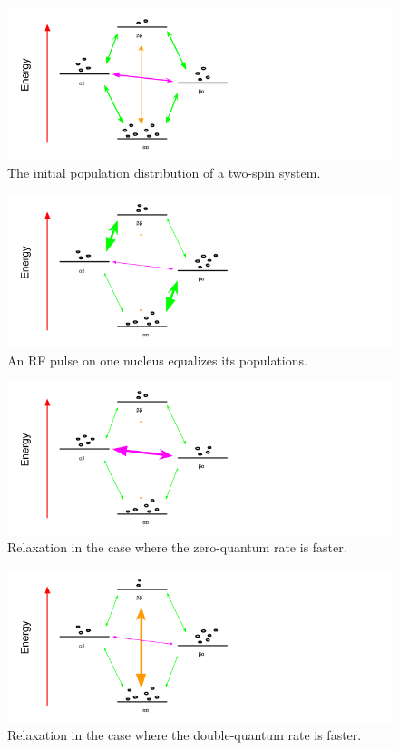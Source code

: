 \begin{figure}[h]
  \includegraphics[scale=0.5]{figures/two_spins_initial}
  \caption{The initial population distribution of a two-spin system.}
  \label{two_spins_initial}
\end{figure}

\begin{figure}[h]
  \includegraphics[scale=0.5]{figures/two_spins_rf}
  \caption{An RF pulse on one nucleus equalizes its populations.}
  \label{two_spins_rf}
\end{figure}

\begin{figure}[h]
  \includegraphics[scale=0.5]{figures/two_spins_w0}
  \caption{Relaxation in the case where the zero-quantum rate is faster.}
  \label{two_spins_w0}
\end{figure}

\begin{figure}[h]
  \includegraphics[scale=0.5]{figures/two_spins_w2}
  \caption{Relaxation in the case where the double-quantum rate is faster.}
  \label{two_spins_w2}
\end{figure}

